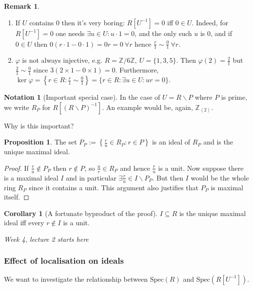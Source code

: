 \documentclass[a4paper]{article}
\newcommand{\la}{\left\langle}
\newcommand{\ra}{\right\rangle}
\newcommand{\Z}{\mathbb Z}
\newcommand{\Spec}{\text{Spec}}
\theoremstyle{definition}
\newtheorem{prop}[defn]{Proposition}
\newtheorem{coro}[defn]{Corollary}
\newtheorem*{remark}{Remark}
\newtheorem*{notation}{Notation}
\begin{document}
\begin{remark}
\begin{enumerate}
\item If $U$ contains 0 then it's very boring: $R[U^{-1}]=0$ iff $0\in U$. Indeed, for $R[U^{-1}]=0$ one needs $\exists u\in U:u\cdot 1=0$, and the only such $u$ is 0, and if $0\in U$ then $0(r\cdot1-0\cdot 1)=0r=0 \ \forall r$ hence $\frac{r}{1}\sim\frac01 \ \forall r$.
\item $\varphi$ is not always injective, e.g. $R=\Z/6\Z,\ U=\{1,3,5\}$. Then $\varphi(2)=\frac21$ but $\frac21 \sim \frac01$ since $3(2\times 1-0\times 1)=0$. Furthermore, $\ker\varphi=\left\{r\in R:\frac{r}{1}\sim \frac01\right\}=\{r\in R:\exists u\in U:ur=0\}$.
\end{enumerate}
\end{remark}

\begin{notation}[Important special case]
In the case of $U=R\backslash P$ where $P$ is prime, we write $R_P$ for $R[(R\backslash P)^{-1}]$. An example would be, again, $\Z_{\la2\ra}$.
\end{notation}
Why is this important?
\begin{prop}
The set $P_P:=\left\{\frac{r}{u}\in R_P:r\in P\right\}$ is an ideal of $R_P$ and is the unique maximal ideal.
\end{prop}
\begin{proof}
If $\frac{r}{u}\notin P_P$ then $r\notin P$, so $\frac{u}{r}\in R_P$ and hence $\frac{r}{u}$ is a unit. Now suppose there is a maximal ideal $I$ and in particular $\exists \frac{r}{u}\in I\backslash P_P$. But then $I$ would be the whole ring $R_P$ since it contains a unit. This argument also justifies that $P_P$ is maximal itself.
\end{proof}

\begin{coro}[A fortunate byproduct of the proof]
$I\subseteq R$ is the unique maximal ideal iff every $r\notin I$ is a unit.
\end{coro}

\begin{flushright}
\textit{Week 4, lecture 2 starts here}
\end{flushright}

\subsubsection{Effect of localisation on ideals}
We want to investigate the relationship between $\Spec(R)$ and $\Spec(R[U^{-1}])$.
\end{document}
